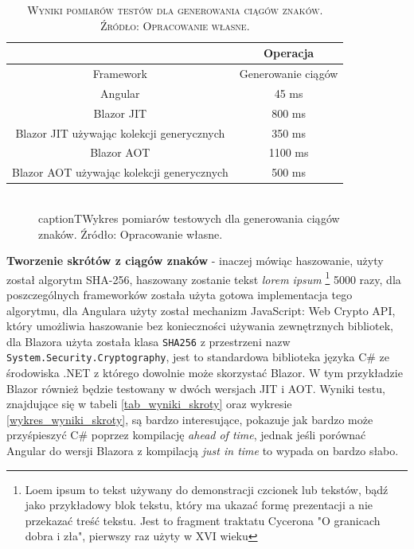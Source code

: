 \documentclass[12pt,a4paper,oneside]{book}
\newcommand{\captionT}[1]{\caption{\textsc{\footnotesize{#1}}}}
\begin{document}
\begin{table}[!htp]
\centering
\captionT{Wyniki pomiarów testów dla generowania ciągów znaków. Źródło: Opracowanie własne.}
\begin{tabular}{ |c|c| }
 \hline
  & Operacja \\
 \hline
  Framework & Generowanie ciągów\\
 \hline
Angular & 45 ms\\
Blazor JIT & 800 ms\\
Blazor JIT używając kolekcji generycznych & 350 ms\\
Blazor AOT & 1100 ms\\
Blazor AOT używając kolekcji generycznych & 500 ms\\

 \hline
\end{tabular}
\label{tab_wyniki_gen}
\end{table}

\begin{figure}[!htp]
\centering
{}
\\captionT{Wykres pomiarów testowych dla generowania ciągów znaków. Źródło: Opracowanie własne.}
\label{wykres_wyniki_gen}
\end{figure}

\textbf{Tworzenie skrótów z ciągów znaków} - inaczej mówiąc haszowanie, użyty został algorytm SHA-256, haszowany zostanie tekst \textit{lorem ipsum} \footnote{Loem ipsum to tekst używany do demonstracji czcionek lub tekstów, bądź jako przykładowy blok tekstu, który ma ukazać formę prezentacji a nie przekazać treść tekstu. Jest to fragment traktatu Cycerona "O granicach dobra i zła", pierwszy raz użyty w XVI wieku} 5000 razy, dla poszczególnych frameworków została użyta gotowa implementacja tego algorytmu, dla Angulara użyty został mechanizm JavaScript: Web Crypto API, który umożliwia haszowanie bez konieczności używania zewnętrznych bibliotek, dla Blazora użyta została klasa \texttt{SHA256} z przestrzeni nazw \texttt{System.Security.Cryptography}, jest to standardowa biblioteka języka C\# ze środowiska .NET z którego dowolnie może skorzystać Blazor. W tym przykładzie Blazor również będzie testowany w dwóch wersjach JIT i AOT. Wyniki testu, znajdujące się w tabeli \ref{tab_wyniki_skroty} oraz wykresie \ref{wykres_wyniki_skroty}, są bardzo interesujące, pokazuje jak bardzo może przyśpieszyć C\# poprzez kompilację \textit{ahead of time}, jednak jeśli porównać Angular do wersji Blazora z kompilacją \textit{just in time} to wypada on bardzo słabo.
\end{document}
